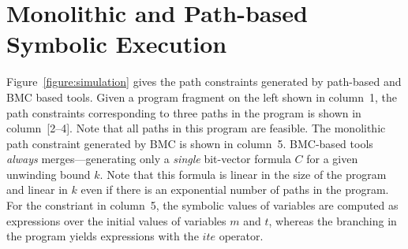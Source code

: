 \section{Monolithic and Path-based Symbolic Execution} 
Figure~\ref{figure:simulation} gives the path constraints generated 
by path-based and BMC based tools. Given a program fragment on the 
left shown in column~1, the path constraints corresponding to three paths 
in the program is shown in column~[2--4]. Note that all paths in this 
program are feasible. The monolithic path constraint generated by BMC 
is shown in column~5. BMC-based tools \emph{always} merges---generating 
only a \emph{single} bit-vector formula $C$ for a given unwinding bound $k$.  Note that 
this formula is linear in the size of the program and linear in $k$ 
even if there is an exponential number of paths in the program.  
For the constriant in column~5, the symbolic values of variables 
are computed as expressions over the initial values of variables 
$m$ and $t$, whereas the branching in the program yields expressions with 
the $\mathit{ite}$ operator.  

